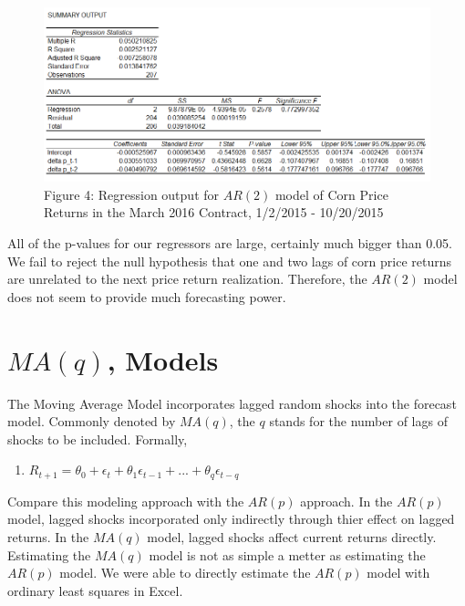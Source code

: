\documentclass[
  letterpaper,
  DIV=11,
  numbers=noendperiod]{scrreprt}
\providecommand{\tightlist}{%
  \setlength{\itemsep}{0pt}\setlength{\parskip}{0pt}}\usepackage{longtable,booktabs,array}
\begin{document}
\begin{figure}

{\centering \includegraphics{images/12_corn_ar2_output.png}

}

\caption{Figure 4: Regression output for \(AR(2)\) model of Corn Price
Returns in the March 2016 Contract, 1/2/2015 - 10/20/2015}

\end{figure}

All of the p-values for our regressors are large, certainly much bigger
than 0.05. We fail to reject the null hypothesis that one and two lags
of corn price returns are unrelated to the next price return
realization. Therefore, the \(AR(2)\) model does not seem to provide
much forecasting power.

\hypertarget{maq-models}{%
\section{\texorpdfstring{\(MA(q)\),
Models}{MA(q), Models}}\label{maq-models}}

The Moving Average Model incorporates lagged random shocks into the
forecast model. Commonly denoted by \(MA(q)\), the \(q\) stands for the
number of lags of shocks to be included. Formally,

\begin{enumerate}
\def\labelenumi{\arabic{enumi}.}
\setcounter{enumi}{1}
\tightlist
\item
  \(R_{t+1} = \theta_0 + \epsilon_t + \theta_1\epsilon_{t-1} + ... + \theta_q\epsilon_{t-q}\)
\end{enumerate}

Compare this modeling approach with the \(AR(p)\) approach. In the
\(AR(p)\) model, lagged shocks incorporated only indirectly through
thier effect on lagged returns. In the \(MA(q)\) model, lagged shocks
affect current returns directly. Estimating the \(MA(q)\) model is not
as simple a metter as estimating the \(AR(p)\) model. We were able to
directly estimate the \(AR(p)\) model with ordinary least squares in
Excel.
\end{document}
